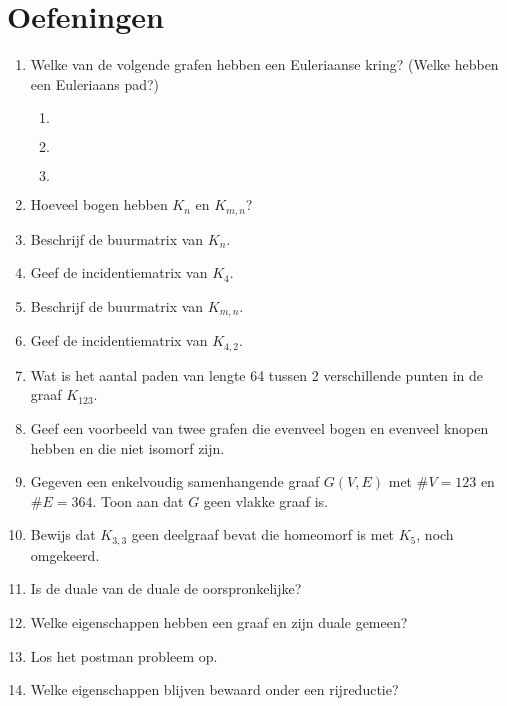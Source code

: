 \section{Oefeningen}
\begin{enumerate}

\item Welke van de volgende grafen hebben een Euleriaanse kring?
(Welke hebben een Euleriaans pad?)
\begin{enumerate}
\item $ $ \\
\item $ $ \\
\item $ $ \\
\end{enumerate}
\item Hoeveel bogen hebben $K_n$ en $K_{m,n}$?
\item Beschrijf de  buurmatrix van $K_n$.
\item Geef de incidentiematrix van $K_4$.
\item Beschrijf de buurmatrix van $K_{m,n}$.
\item Geef de incidentiematrix van $K_{4,2}$.
\item Wat is het aantal paden van lengte 64 tussen 2 verschillende 
punten in de graaf $K_{123}$.
\item Geef een voorbeeld van twee grafen die evenveel bogen en evenveel 
knopen hebben en die niet isomorf zijn.
\item Gegeven een enkelvoudig samenhangende graaf $G(V,E)$ met 
$\#V=123$ en $\#E=364$. Toon aan dat $G$ geen vlakke graaf is. 

\item Bewijs dat $K_{3,3}$ geen deelgraaf bevat die homeomorf is
met $K_{5}$, noch omgekeerd.

\item Is de duale van de duale de oorspronkelijke?

\item Welke eigenschappen hebben een graaf en zijn duale gemeen?

\item Los het postman probleem op.

\item Welke eigenschappen blijven bewaard onder een rijreductie?


\end{enumerate}
